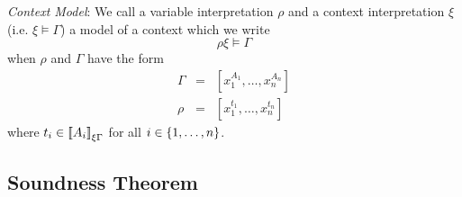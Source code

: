 \begin{definition}
    \label{DefinitionContextModel}
    \emph{Context Model}: We call a variable interpretation $\rho$ and a context
    interpretation $\xi$ (i.e. $\xi \vDash \Gamma$) a model of a context which
    we write
    $$
        \rho\xi \vDash \Gamma
    $$
    when
    $\rho$ and $\Gamma$ have the form
    $$
    \begin{array}{lll}
        \Gamma &=& [x_1^{A_1}, \ldots, x_n^{A_n}]
        \\
        \rho   &=& [x_1^{t_1}, \ldots, x_n^{t_n}]
    \end{array}
    $$
    where $t_i \in {{{[\![}A_i {]\!]}}_{\xi\Gamma}}$ for all $i \in {\{1,\ldots,n\}}$.
\end{definition}




\subsection{Soundness Theorem}

